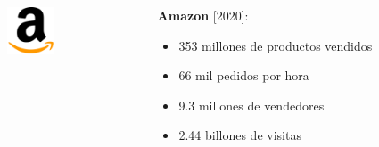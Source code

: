 \begin{frame}
\begin{columns}[T]
     
        \begin{column}{.48\textwidth}
            \begin{columns}[T]
                \begin{column}{0.20\textwidth}
                    \includegraphics[width=1.4cm]{img/amazon.png}
                \end{column}
                \begin{column}{0.78\textwidth}
                    \large \textbf{Amazon} [2020]:
                    \begin{itemize}
                        \item \small 353 millones de productos vendidos
                        \item  \small 66 mil pedidos por hora
                        \item \small 9.3 millones de vendedores
                        \item \small 2.44 billones de visitas
                    \end{itemize}
                \end{column}
            \end{columns}
        \end{column}
    \end{columns}
\end{frame}